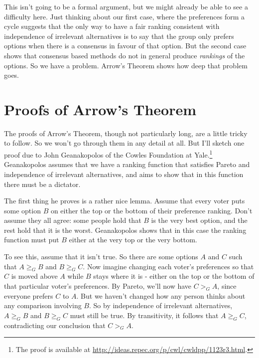 \documentclass[11pt,]{article}
\let\rmarkdownfootnote\footnote%
\def\footnote{\protect\rmarkdownfootnote}
\begin{document}
This isn't going to be a formal argument, but we might already be able
to see a difficulty here. Just thinking about our first case, where the
preferences form a cycle suggests that the only way to have a fair
ranking consistent with independence of irrelevant alternatives is to
say that the group only prefers options when there is a consensus in
favour of that option. But the second case shows that consensus based
methods do not in general produce \emph{rankings} of the options. So we
have a problem. Arrow's Theorem shows how deep that problem goes.

\hypertarget{proofs-of-arrows-theorem}{%
\section{Proofs of Arrow's Theorem}\label{proofs-of-arrows-theorem}}

The proofs of Arrow's Theorem, though not particularly long, are a
little tricky to follow. So we won't go through them in any detail at
all. But I'll sketch one proof due to John Geanakopolos of the Cowles
Foundation at Yale.\footnote{The proof is available at
  \url{http://ideas.repec.org/p/cwl/cwldpp/1123r3.html}.} Geanakopolos
assumes that we have a ranking function that satisfies Pareto and
independence of irrelevant alternatives, and aims to show that in this
function there must be a dictator.

The first thing he proves is a rather nice lemma. Assume that every
voter puts some option \(B\) on either the top or the bottom of their
preference ranking. Don't assume they all agree: some people hold that
\(B\) is the very best option, and the rest hold that it is the worst.
Geanakopolos shows that in this case the ranking function must put \(B\)
either at the very top or the very bottom.

To see this, assume that it isn't true. So there are some options \(A\)
and \(C\) such that \(A \geq_G B\) and \(B \geq_G C\). Now imagine
changing each voter's preferences so that \(C\) is moved above \(A\)
while \(B\) stays where it is - either on the top or the bottom of that
particular voter's preferences. By Pareto, we'll now have \(C >_G A\),
since everyone prefers \(C\) to \(A\). But we haven't changed how any
person thinks about any comparison involving \(B\). So by independence
of irrelevant alternatives, \(A \geq_G B\) and \(B \geq_G C\) must still
be true. By transitivity, it follows that \(A \geq_G C\), contradicting
our conclusion that \(C >_G A\).
\end{document}
